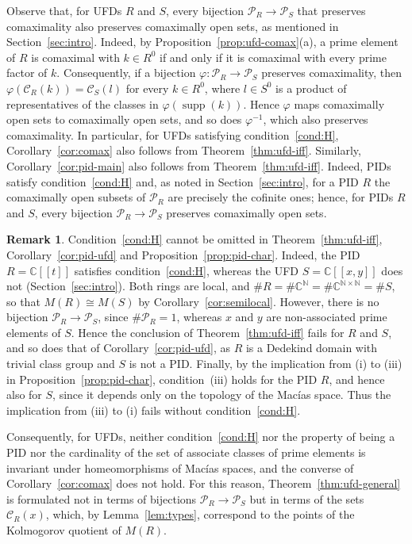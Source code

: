 \documentclass[12pt,reqno,a4paper]{amsart}
\newcommand{\N}{\mathbb{N}}
\newcommand{\C}{\mathbb{C}}
\newcommand{\Pe}{\mathcal{P}}
\newcommand{\pow}[1]{[\![#1]\!]}
\DeclareMathOperator{\supp}{supp}
\theoremstyle{plain}
\theoremstyle{definition}
\newtheorem{remark}[theorem]{Remark}
\begin{document}
Observe that, for UFDs $R$ and $S$, every bijection $\Pe_R\to\Pe_S$ that preserves comaximality also preserves comaximally open sets, as mentioned in Section~\ref{sec:intro}. Indeed, by Proposition~\ref{prop:ufd-comax}(a), a prime element of $R$ is comaximal with $k\in R^0$ if and only if it is comaximal with every prime factor of $k$. Consequently, if a bijection $\varphi\colon\Pe_R\to\Pe_S$ preserves comaximality, then $\varphi(\mathcal{C}_R(k))=\mathcal{C}_S(l)$ for every $k\in R^0$, where $l\in S^0$ is a product of representatives of the classes in $\varphi(\supp(k))$. Hence $\varphi$ maps comaximally open sets to comaximally open sets, and so does $\varphi^{-1}$, which also preserves comaximality. In particular, for UFDs satisfying condition~\ref{cond:H}, Corollary~\ref{cor:comax} also follows from Theorem~\ref{thm:ufd-iff}. Similarly, Corollary~\ref{cor:pid-main} also follows from Theorem~\ref{thm:ufd-iff}. Indeed, PIDs satisfy condition~\ref{cond:H} and, as noted in Section~\ref{sec:intro}, for a PID $R$ the comaximally open subsets of $\Pe_R$ are precisely the cofinite ones; hence, for PIDs $R$ and $S$, every bijection $\Pe_R\to\Pe_S$ preserves comaximally open sets.
\begin{remark}\label{rem:J-ufd-sharp}
Condition~\ref{cond:H} cannot be omitted in Theorem~\ref{thm:ufd-iff}, Corollary~\ref{cor:pid-ufd} and Proposition~\ref{prop:pid-char}. Indeed, the PID $R=\C\pow{t}$ satisfies condition~\ref{cond:H}, whereas the UFD $S=\C\pow{x,y}$ does not (Section~\ref{sec:intro}). Both rings are local, and $\#R=\#\C^{\N}=\#\C^{\N\times\N}=\#S$, so that $M(R)\cong M(S)$ by Corollary~\ref{cor:semilocal}. However, there is no bijection $\Pe_R\to\Pe_S$, since $\#\Pe_R=1$, whereas $x$ and $y$ are non-associated prime elements of $S$. Hence the conclusion of Theorem~\ref{thm:ufd-iff} fails for $R$ and $S$, and so does that of Corollary~\ref{cor:pid-ufd}, as $R$ is a Dedekind domain with trivial class group and $S$ is not a PID. Finally, by the implication from (i) to (iii) in Proposition~\ref{prop:pid-char}, condition~(iii) holds for the PID $R$, and hence also for $S$, since it depends only on the topology of the Mac\'ias space. Thus the implication from (iii) to (i) fails without condition~\ref{cond:H}.

Consequently, for UFDs, neither condition~\ref{cond:H} nor the property of being a PID nor the cardinality of the set of associate classes of prime elements is invariant under homeomorphisms of Mac\'ias spaces, and the converse of Corollary~\ref{cor:comax} does not hold. For this reason, Theorem~\ref{thm:ufd-general} is formulated not in terms of bijections $\Pe_R\to\Pe_S$ but in terms of the sets $\mathcal{C}_R(x)$, which, by Lemma~\ref{lem:types}, correspond to the points of the Kolmogorov quotient of $M(R)$.
\end{remark}
\end{document}
